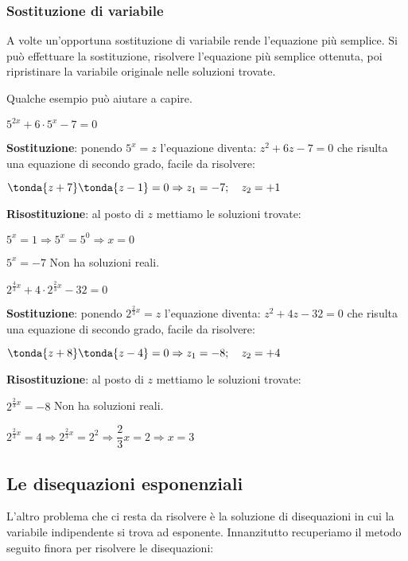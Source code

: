 \subsubsection{Sostituzione di variabile}
\label{subsubsec:esplog_sostituzione}

A volte un'opportuna sostituzione di variabile rende l'equazione più semplice. 
Si può effettuare la sostituzione, risolvere l'equazione più semplice ottenuta, 
poi ripristinare la variabile originale nelle soluzioni trovate. 

Qualche esempio può aiutare a capire.

\begin{esempio} 
\(5^{2x} +6 \cdot 5^x -7=0\) 

\textbf{Sostituzione}:
ponendo \(5^x=z\) l'equazione diventa: \(z^2 +6z -7=0\) 
che risulta una equazione di secondo grado, facile da risolvere:

\(\tonda{z+7}\tonda{z-1}=0 \Rightarrow z_1=-7; \quad z_2=+1\) 

\textbf{Risostituzione}: al posto di \(z\) mettiamo le soluzioni trovate:

\(5^x=1 \Rightarrow 5^x=5^0 \Rightarrow x=0\)

\(5^x=-7\) Non ha soluzioni reali.
\end{esempio}

\begin{esempio} 
\(2^{\frac{4}{3}x} +4 \cdot 2^{\frac{2}{3}x} -32=0\) 

\textbf{Sostituzione}:
ponendo \(2^{\frac{2}{3}x}=z\) l'equazione diventa: \(z^2 +4z -32=0\) 
che risulta una equazione di secondo grado, facile da risolvere:

\(\tonda{z+8}\tonda{z-4}=0 \Rightarrow z_1=-8; \quad z_2=+4\) 

\textbf{Risostituzione}: al posto di \(z\) mettiamo le soluzioni trovate:

\(2^{\frac{2}{3}x}=-8\) Non ha soluzioni reali.

\(2^{\frac{2}{3}x}=4 \Rightarrow 2^{\frac{2}{3}x}=2^2
\Rightarrow \dfrac{2}{3}x=2 \Rightarrow x=3\)
\end{esempio}

\subsection{Le disequazioni esponenziali}
\label{subsubsec:esplog_disequazioniesponenziali}

L'altro problema che ci resta da risolvere è la soluzione di disequazioni in 
cui la variabile indipendente si trova ad esponente. Innanzitutto recuperiamo 
il metodo seguito finora per risolvere le disequazioni:

